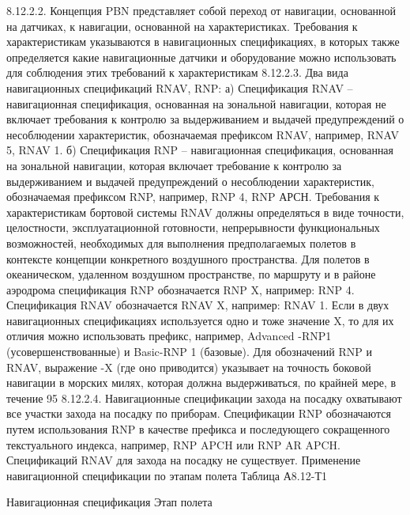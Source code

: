 8.12.2.2. Концепция PBN представляет собой переход от навигации, основанной на датчиках, к навигации, основанной на характеристиках. Требования к характеристикам указываются в навигационных спецификациях, в которых также определяется какие навигационные датчики и оборудование можно использовать для соблюдения этих требований к характеристикам
8.12.2.3.	Два вида навигационных спецификаций RNAV, RNP:
а)	Спецификация RNAV – навигационная спецификация, основанная на зональной навигации, которая не включает требования к контролю за выдерживанием и выдачей предупреждений о несоблюдении характеристик, обозначаемая префиксом RNAV, например, RNAV 5, RNAV 1.
б)	Спецификация RNP – навигационная спецификация, основанная на зональной навигации, которая включает требование к контролю за выдерживанием и выдачей предупреждений о несоблюдении характеристик, обозначаемая префиксом RNP, например, RNP 4, RNP АРСН.
Требования к характеристикам бортовой системы RNAV должны определяться в виде точности, целостности, эксплуатационной готовности, непрерывности функциональных возможностей, необходимых для выполнения предполагаемых полетов в контексте концепции конкретного воздушного пространства.
Для полетов в океаническом, удаленном воздушном пространстве, по маршруту и в районе аэродрома спецификация RNP обозначается RNP X, например: RNP 4.
Спецификация RNAV обозначается RNAV X, например: RNAV 1. Если в двух навигационных спецификациях используется одно и тоже значение X, то для их отличия можно использовать префикс, например, Advanced -RNP1 (усовершенствованные) и Basic-RNP 1 (базовые).
Для обозначений RNP и RNAV, выражение -X (где оно приводится) указывает на точность боковой навигации в морских милях, которая должна выдерживаться, по крайней мере, в течение 95%
8.12.2.4. Навигационные спецификации захода на посадку охватывают все участки захода на посадку по приборам. Спецификации RNP обозначаются путем использования RNP в качестве префикса и последующего сокращенного текстуального индекса, например, RNP APCH или RNP AR APCH. Спецификаций RNAV для захода на посадку не существует.
Применение навигационной спецификации по этапам полета
                                                                                                                                    Таблица А8.12-Т1

Навигационная     спецификация	Этап полета
	
